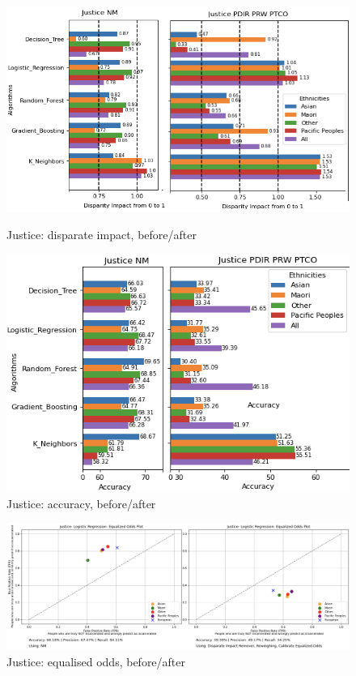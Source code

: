 \documentclass[runningheads]{llncs}
\begin{document}
\begin{figure}
    \begin{minipage}{0.55\textwidth}
        \includegraphics[width=\textwidth]{../tex/justice_di_1_2}
        \caption{Justice: disparate impact, before/after}
        \label{fig:justice-di-mitigations}
    \end{minipage}
    \begin{minipage}{0.44\textwidth}
        \includegraphics[width=\textwidth]{../tex/justice_acc_1_2}
        \caption{Justice: accuracy, before/after}
        \label{fig:justice-acc-mitigations}
    \end{minipage}
\end{figure}

\begin{figure}
    \centering
    \includegraphics[width=\textwidth]{../tex/justice_eqq}
    \caption{Justice: equalised odds, before/after}
    \label{fig:justice-eqq-mitigations}
\end{figure}
\end{document}
